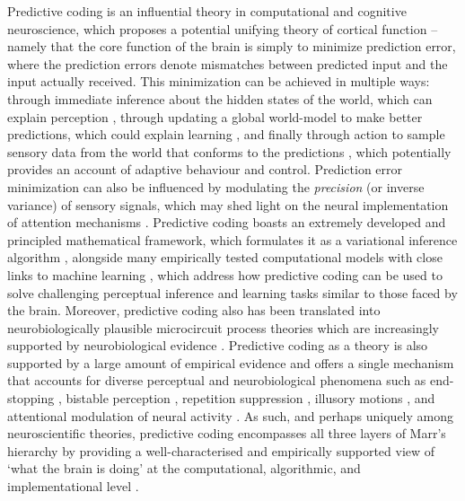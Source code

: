 Predictive coding is an influential theory in computational and cognitive neuroscience, which proposes a potential unifying theory of cortical function \citep{friston2003learning,friston2005theory,rao1999predictive,friston2010free,clark2013whatever,seth2014cybernetic} -- namely that the core function of the brain is simply to minimize prediction error, where the prediction errors denote mismatches between predicted input and the input actually received. This minimization can be achieved in multiple ways: through immediate inference about the hidden states of the world, which can explain perception \citep{beal2003variational}, through updating a global world-model to make better predictions, which could explain learning \citep{friston2003learning,neal1998view}, and finally through action to sample sensory data from the world that conforms to the predictions \citep{friston2009reinforcement}, which potentially provides an account of adaptive behaviour and control. Prediction error minimization can also be influenced by modulating the \emph{precision} (or inverse variance) of sensory signals, which may shed light on the neural implementation of attention mechanisms \citep{feldman2010attention,kanai2015cerebral}. Predictive coding boasts an extremely developed and principled mathematical framework, which formulates it as a variational inference algorithm \citep{blei2017variational,ghahramani2000graphical, jordan1998introduction}, alongside many empirically tested computational models with close links to machine learning \citep{beal2003variational,dayan1995helmholtz,hinton1994autoencoders}, which address how predictive coding can be used to solve challenging perceptual inference and learning tasks similar to those faced by the brain. Moreover, predictive coding also has been translated into neurobiologically plausible microcircuit process theories \citep{bastos2012canonical,shipp2016neural,shipp2013reflections} which are increasingly supported by neurobiological evidence \citep{walsh2020evaluating}. Predictive coding as a theory is also supported by a large amount of empirical evidence and offers a single mechanism that accounts for diverse perceptual and neurobiological phenomena such as end-stopping \citep{rao1999predictive}, bistable perception \citep{hohwy2008predictive,weilnhammer2017predictive}, repetition suppression \citep{auksztulewicz2016repetition}, illusory motions \citep{lotter2016deep,watanabe2018illusory}, and attentional modulation of neural activity \citep{feldman2010attention,kanai2015cerebral}. As such, and perhaps uniquely among neuroscientific theories, predictive coding encompasses all three layers of Marr's hierarchy by providing a well-characterised and empirically supported view of `what the brain is doing' at the computational, algorithmic, and implementational level \citep{marr1982vision}.

